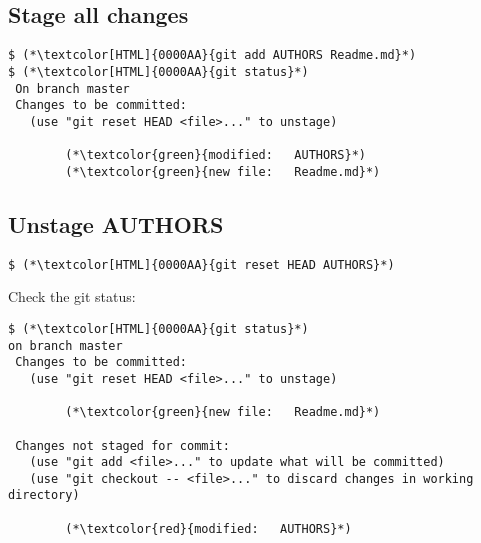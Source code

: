 \subsection{Stage all changes}
\begin{frame}[fragile]
\subslidetitle
\begin{lstlisting}
$ (*\textcolor[HTML]{0000AA}{git add AUTHORS Readme.md}*)
$ (*\textcolor[HTML]{0000AA}{git status}*)
 On branch master
 Changes to be committed:
   (use "git reset HEAD <file>..." to unstage)

        (*\textcolor{green}{modified:   AUTHORS}*)
        (*\textcolor{green}{new file:   Readme.md}*)

\end{lstlisting}
\end{frame}

\subsection{Unstage AUTHORS}
\begin{frame}[fragile]
  \subslidetitle

  \begin{lstlisting}
$ (*\textcolor[HTML]{0000AA}{git reset HEAD AUTHORS}*)
  \end{lstlisting}

  Check the git status:
  \begin{lstlisting}
$ (*\textcolor[HTML]{0000AA}{git status}*)
on branch master
 Changes to be committed:
   (use "git reset HEAD <file>..." to unstage)

        (*\textcolor{green}{new file:   Readme.md}*)

 Changes not staged for commit:
   (use "git add <file>..." to update what will be committed)
   (use "git checkout -- <file>..." to discard changes in working directory)

        (*\textcolor{red}{modified:   AUTHORS}*)

  \end{lstlisting}
\end{frame}
